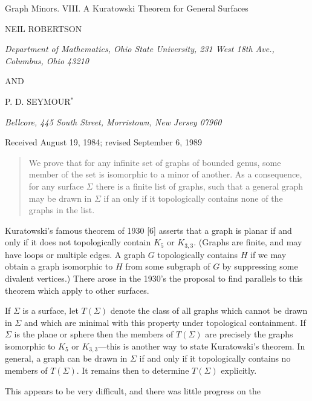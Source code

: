 {\centering
{\Large Graph Minors. VIII. A Kuratowski Theorem for General Surfaces\par}\medskip

NEIL ROBERTSON\par
\textit{Department of Mathematics, Ohio State University, 231 West 18th Ave., Columbus, Ohio 43210}\par
AND\par
P. D. SEYMOUR$^*$\par
\textit{Bellcore, 445 South Street, Morristown, New Jersey 07960}\par
Received August 19, 1984; revised September 6, 1989\par
}
\begin{quote}
We prove that for any infinite set of graphs of bounded genus, some member of the set is isomorphic to a minor of another. As a consequence, for any surface $\Sigma$ there is a finite list of graphs, such that a general graph may be drawn in $\Sigma$ if an only if it topologically contains none of the graphs in the list.

\end{quote}


Kuratowski's famous theorem of 1930 [6] asserts that a graph is planar if and only if it does not topologically contain $K_5$ or $K_{3,3}$. (Graphs are finite, and may have loops or multiple edges. A graph $G$ topologically contains $H$ if we may obtain a graph isomorphic to $H$ from some subgraph of $G$ by suppressing some divalent vertices.) There arose in the 1930's the proposal to find parallels to this theorem which apply to other surfaces.

If $\Sigma$ is a surface, let $T(\Sigma)$ denote the class of all graphs which cannot be drawn in $\Sigma$ and which are minimal with this property under topological containment. If $\Sigma$ is the plane or sphere then the members of $T(\Sigma)$ are precisely the graphs isomorphic to $K_5$ or $K_{3,3}$---this is another way to state Kuratowski's theorem. In general, a graph can be drawn in $\Sigma$ if and only if it topologically contains no members of $T(\Sigma)$. It remains then to determine $T(\Sigma)$ explicitly.

This appears to be very difficult, and there was little progress on the%
